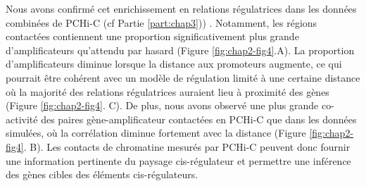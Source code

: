Nous avons confirmé cet enrichissement en relations régulatrices dans les données combinées de \gls{PCHi-C} (cf Partie \ref{part:chap3})) \citep{laverre_long-range_2022}. Notamment, les régions contactées contiennent une proportion significativement plus grande d’\glspl{amplificateur} qu’attendu par hasard (Figure \ref{fig:chap2-fig4}.A). La proportion d’\glspl{amplificateur} diminue lorsque la distance aux promoteurs augmente, ce qui pourrait être cohérent avec un modèle de régulation limité à une certaine distance où la majorité des relations régulatrices auraient lieu à proximité des gènes (Figure \ref{fig:chap2-fig4}. C). De plus, nous avons observé une plus grande co-activité des paires gène-\gls{amplificateur} contactées en \gls{PCHi-C} que dans les données simulées, où la corrélation diminue fortement avec la distance (Figure \ref{fig:chap2-fig4}. B). Les contacts de chromatine mesurés par \gls{PCHi-C} peuvent donc fournir une information pertinente du paysage \gls{cis}-régulateur et permettre une inférence des gènes cibles des éléments \gls{cis}-régulateurs.

